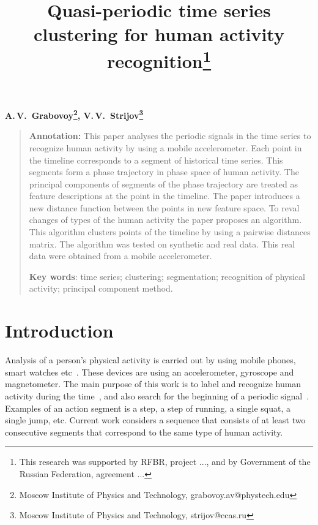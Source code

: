 \documentclass[12pt, twoside]{article}
\numberwithin{equation}{section}
\begin{document}
\title{\bf Quasi-periodic time series clustering for human activity recognition\thanks{This research was supported by RFBR, project ..., and by Government of the Russian Federation, agreement ...}}
\date{}
\author{}
\maketitle

\begin{center}
\bf
A.\,V.~Grabovoy\footnote{Moscow Institute of Physics and Technology, grabovoy.av@phystech.edu}, V.\,V.~Strijov\footnote{Moscow Institute of Physics and Technology, strijov@ccas.ru}

\end{center}

{\centering\begin{quote}
\textbf{Annotation:} This paper analyses the periodic signals in the time series to recognize human activity by using a mobile accelerometer. 
Each point in the timeline corresponds to a segment of historical time series. This segments form a phase trajectory in phase space of human activity.
The principal components of segments of the phase trajectory are treated as feature descriptions at the point in the timeline.
The paper introduces a new distance function between the points in new feature space.
To reval changes of types of the human activity the paper proposes an algorithm. This algorithm clusters points of the timeline by using a pairwise distances matrix.
The algorithm was tested on synthetic and real data. This real data were obtained from a mobile accelerometer.


\smallskip
\textbf{Key words}: time series; clustering; segmentation; recognition of physical activity; principal component method.

\smallskip
\end{quote}
}

\section{Introduction}
Analysis of a person’s physical activity is carried out by using mobile phones, smart watches etc~\cite{kwapisz2010, wang2014}.
These devices are using an accelerometer, gyroscope and magnetometer. 
The main purpose of this work is to label and recognize human activity during the time~\cite{Ignatov2015, Olivares2012}, and also search for the beginning of a periodic signal~\cite{motrenko2015, cinar2018}.
Examples of an action segment is a step, a step of running, a single squat, a single jump, etc.
Current work considers a sequence that consists of at least two consecutive segments that correspond to the same type of human activity.
\end{document}
